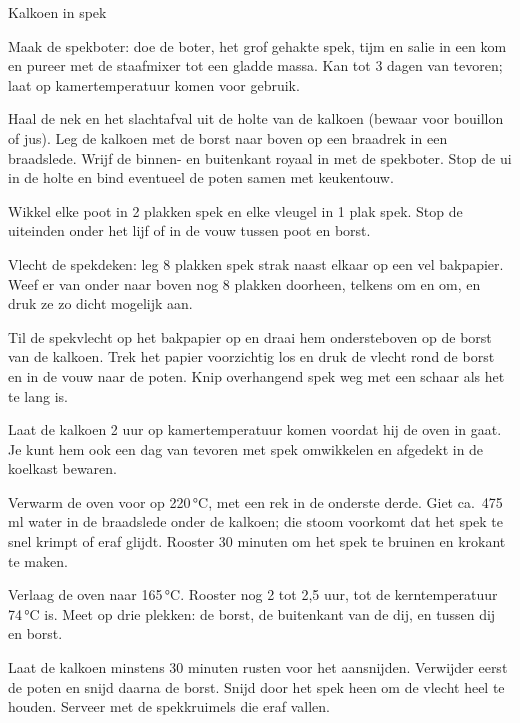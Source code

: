 \begin{recipe}{Kalkoen in spek}
\begin{steps}
  \item Maak de spekboter: doe de boter, het grof gehakte spek, tijm en salie
        in een kom en pureer met de staafmixer tot een gladde massa. Kan tot
        3 dagen van tevoren; laat op kamertemperatuur komen voor gebruik.
  \item Haal de nek en het slachtafval uit de holte van de kalkoen (bewaar voor
        bouillon of jus). Leg de kalkoen met de borst naar boven op een braadrek
        in een braadslede. Wrijf de binnen- en buitenkant royaal in met de
        spekboter. Stop de ui in de holte en bind eventueel de poten samen met
        keukentouw.
  \item Wikkel elke poot in 2 plakken spek en elke vleugel in 1 plak spek. Stop
        de uiteinden onder het lijf of in de vouw tussen poot en borst.
  \item Vlecht de spekdeken: leg 8 plakken spek strak naast elkaar op een vel
        bakpapier. Weef er van onder naar boven nog 8 plakken doorheen, telkens
        om en om, en druk ze zo dicht mogelijk aan.
  \item Til de spekvlecht op het bakpapier op en draai hem ondersteboven op de
        borst van de kalkoen. Trek het papier voorzichtig los en druk de vlecht
        rond de borst en in de vouw naar de poten. Knip overhangend spek weg met
        een schaar als het te lang is.
  \item Laat de kalkoen 2 uur op kamertemperatuur komen voordat hij de oven in
        gaat. Je kunt hem ook een dag van tevoren met spek omwikkelen en
        afgedekt in de koelkast bewaren.
  \item Verwarm de oven voor op 220\,°C, met een rek in de onderste derde.
        Giet ca.\ 475 ml water in de braadslede onder de kalkoen; die stoom
        voorkomt dat het spek te snel krimpt of eraf glijdt. Rooster 30 minuten
        om het spek te bruinen en krokant te maken.
  \item Verlaag de oven naar 165\,°C. Rooster nog 2 tot 2,5 uur, tot de
        kerntemperatuur 74\,°C is. Meet op drie plekken: de borst, de
        buitenkant van de dij, en tussen dij en borst.
  \item Laat de kalkoen minstens 30 minuten rusten voor het aansnijden. Verwijder
        eerst de poten en snijd daarna de borst. Snijd door het spek heen om de
        vlecht heel te houden. Serveer met de spekkruimels die eraf vallen.
\end{steps}
\end{recipe}
